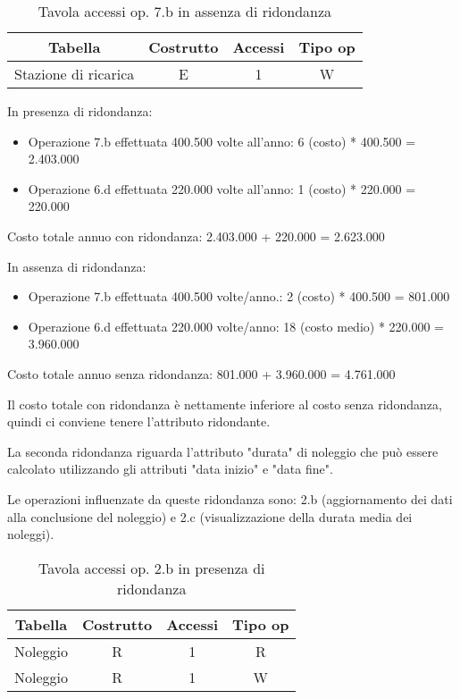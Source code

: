 \documentclass{article}
\begin{document}
\begin{table}[h]
  \centering
  \begin{tabular}{|c|c|c|c|}
    \hline
    Tabella & Costrutto & Accessi & Tipo op \\ \hline
    Stazione di ricarica & E & 1 & W \\ \hline
  \end{tabular}
  \caption{Tavola accessi op. 7.b in assenza di ridondanza}
  \label{tab:label}
\end{table}

In presenza di ridondanza: 

\begin{itemize}
    \item Operazione 7.b effettuata 400.500 volte all'anno: 6 (costo) * 400.500 = 2.403.000
    \item Operazione 6.d effettuata 220.000 volte all'anno: 1 (costo) * 220.000 = 220.000
\end{itemize}

Costo totale annuo con ridondanza: 2.403.000 + 220.000 = 2.623.000

In assenza di ridondanza: 
\begin{itemize}
    \item Operazione 7.b effettuata 400.500 volte/anno.: 2 (costo) * 400.500 = 801.000
    \item Operazione 6.d effettuata 220.000 volte/anno: 18 (costo medio) * 220.000 = 3.960.000
\end{itemize}

Costo totale annuo senza ridondanza: 801.000 + 3.960.000 = 4.761.000

Il costo totale con ridondanza è nettamente inferiore al costo senza ridondanza, quindi ci conviene tenere l'attributo ridondante.

La seconda ridondanza riguarda l'attributo "durata" di noleggio che può essere calcolato utilizzando gli attributi "data inizio" e "data fine". 

Le operazioni influenzate da queste ridondanza sono: 2.b (aggiornamento dei dati alla conclusione del noleggio) e 2.c (visualizzazione della durata media dei noleggi). 

\begin{table}[h]
  \centering
  \begin{tabular}{|c|c|c|c|}
    \hline
    Tabella & Costrutto & Accessi & Tipo op \\ \hline
    Noleggio & R & 1 & R  \\ \hline %
    Noleggio & R & 1 & W  \\ \hline 
  \end{tabular}
  \caption{Tavola accessi op. 2.b in presenza di ridondanza}
\end{table}
\end{document}
